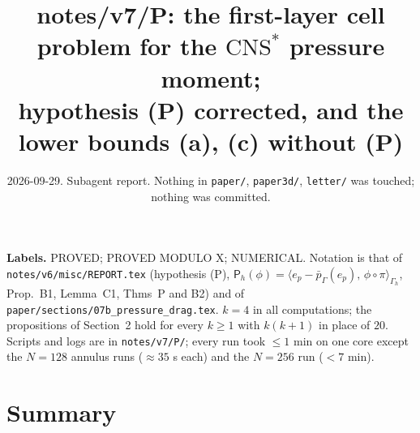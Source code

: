 \documentclass[11pt,reqno]{amsart}
\theoremstyle{plain}
\theoremstyle{definition}
\newcommand{\Gh}{\Gamma_h}
\newcommand{\ip}[2]{\langle #1,\, #2\rangle}
\newcommand{\CNS}{\mathrm{CNS}^\ast}
\newcommand{\Pm}{\mathsf P_h}
\newcommand{\pbG}{\bar p_{\Gamma}}
\begin{document}
\title[notes/v7/P]{notes/v7/P: the first-layer cell problem for the $\CNS$ pressure moment;\\ hypothesis (P) corrected, and the lower bounds (a), (c) without (P)}
\date{2026-09-29. Subagent report. Nothing in \texttt{paper/}, \texttt{paper3d/}, \texttt{letter/} was touched; nothing was committed.}
\maketitle

\noindent\textbf{Labels.} PROVED; PROVED MODULO X; NUMERICAL. Notation is that of \texttt{notes/v6/misc/REPORT.tex} (hypothesis (P), $\Pm(\phi)=\ip{e_p-\pbG(e_p)}{\phi\circ\pi}_{\Gh}$, Prop.~B1, Lemma~C1, Thms~P and B2) and of \texttt{paper/sections/07b\_pressure\_drag.tex}. $k=4$ in all computations; the propositions of Section~2 hold for every $k\ge1$ with $k(k+1)$ in place of $20$. Scripts and logs are in \texttt{notes/v7/P/}; every run took $\le 1$ min on one core except the $N=128$ annulus runs ($\approx35$ s each) and the $N=256$ run ($<7$ min).

\section*{Summary}
\end{document}
